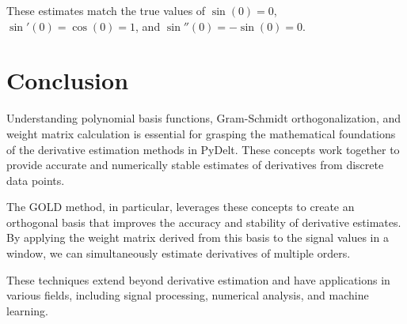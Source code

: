 \documentclass{article}
\begin{document}
These estimates match the true values of $\sin(0) = 0$, $\sin'(0) = \cos(0) = 1$, and $\sin''(0) = -\sin(0) = 0$.

\section{Conclusion}

Understanding polynomial basis functions, Gram-Schmidt orthogonalization, and weight matrix calculation is essential for grasping the mathematical foundations of the derivative estimation methods in PyDelt. These concepts work together to provide accurate and numerically stable estimates of derivatives from discrete data points.

The GOLD method, in particular, leverages these concepts to create an orthogonal basis that improves the accuracy and stability of derivative estimates. By applying the weight matrix derived from this basis to the signal values in a window, we can simultaneously estimate derivatives of multiple orders.

These techniques extend beyond derivative estimation and have applications in various fields, including signal processing, numerical analysis, and machine learning.
\end{document}
